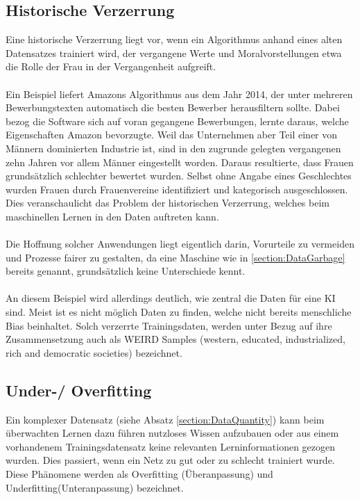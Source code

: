 \documentclass[12pt,oneside,a4paper,parskip]{scrbook}
\begin{document}
\subsection{Historische Verzerrung}
\label{section:biasInTest}
Eine historische Verzerrung liegt vor, wenn ein Algorithmus anhand eines alten Datensatzes trainiert wird, der vergangene Werte und Moralvorstellungen etwa die Rolle der Frau in der Vergangenheit aufgreift\cite{kipedia}.
\\\\
Ein Beispiel liefert Amazons Algorithmus aus dem Jahr 2014, der unter mehreren Bewerbungstexten automatisch die besten Bewerber herausfiltern sollte. Dabei bezog die Software sich auf voran gegangene Bewerbungen, lernte daraus, welche Eigenschaften Amazon bevorzugte. Weil das Unternehmen aber Teil einer von Männern dominierten Industrie ist, sind in den zugrunde gelegten vergangenen zehn Jahren vor allem Männer eingestellt worden. Daraus resultierte, dass Frauen grundsätzlich schlechter bewertet wurden. Selbst ohne Angabe eines Geschlechtes wurden Frauen durch Frauenvereine identifiziert und kategorisch ausgeschlossen. Dies veranschaulicht das Problem der historischen Verzerrung, welches beim maschinellen Lernen in den Daten auftreten kann\cite{amazon}.
\\\\
Die Hoffnung solcher Anwendungen liegt eigentlich darin, Vorurteile zu vermeiden und Prozesse fairer zu gestalten, da eine Maschine wie in \ref{section:DataGarbage} bereits genannt, grundsätzlich keine Unterschiede kennt.
\\\\
An diesem Beispiel wird allerdings deutlich, wie zentral die Daten für eine KI sind.
Meist ist es nicht möglich Daten zu finden, welche nicht bereits menschliche Bias beinhaltet. Solch verzerrte Trainingsdaten, werden unter Bezug auf ihre Zusammensetzung auch als WEIRD Samples (western, educated, industrialized, rich and democratic societies) bezeichnet\cite{BiasInKi}.

\subsection{Under-/ Overfitting}
\label{section:OverUnderfitting}

Ein komplexer Datensatz (siehe Absatz \ref{section:DataQuantity}) kann beim überwachten Lernen dazu führen nutzloses Wissen aufzubauen oder aus einem vorhandenem Trainingsdatensatz keine relevanten Lerninformationen gezogen wurden. %
Dies passiert, wenn ein Netz zu gut oder zu schlecht trainiert wurde. Diese Phänomene werden als Overfitting (Überanpassung) und Underfitting(Unteranpassung) bezeichnet.
\end{document}

